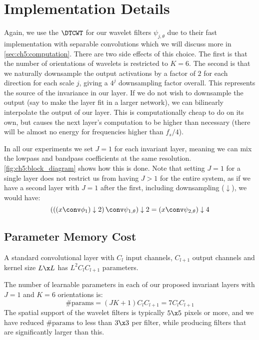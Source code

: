 \section{Implementation Details}\label{sec:ch5:implementation}
Again, we use the $\DTCWT$ \cite{selesnick_dual-tree_2005} for our wavelet filters
$\psi_{j, \theta}$ due to their fast implementation with separable convolutions
which we will discuss more in \autoref{sec:ch5:computation}.  There are two side
effects of this choice. The first is that the number of orientations of wavelets
is restricted to $K=6$. The second is that we naturally downsample the output
activations by a factor of $2$ for each direction for each scale $j$, giving a 
$4^j$ downsampling factor overall. This represents the
source of the invariance in our layer. If we do not wish to downsample the
output (say to make the layer fit in a larger network), we can bilinearly
interpolate the output of our layer. This is computationally cheap to do on its
own, but causes the next layer's computation to be higher than necessary (there
will be almost no energy for frequencies higher than $f_s/4$).

In all our experiments we set $J=1$ for each invariant layer,
meaning we can mix the lowpass and bandpass coefficients at the same resolution.
\autoref{fig:ch5:block_diagram} shows how this is done. Note that setting $J=1$ for
a single layer does not restrict us from having $J>1$ for the entire system, as
if we have a second layer with $J=1$ after the first, including downsampling
($\downarrow$), we would have:
%
\begin{equation}
  \left(\left(\left(x \conv \phi_1\right) \downarrow 2\right) \conv \psi_{1, \theta}\right) 
    \downarrow 2 = \left(x \conv \psi_{2, \theta}\right) \downarrow 4
\end{equation}

\subsection{Parameter Memory Cost}\label{sec:ch5:memory}
A standard convolutional layer with $C_l$ input channels, $C_{l+1}$ output channels
and kernel size $L\x L$ has $L^2C_{l}C_{l+1}$ parameters. 

The number of learnable parameters in each of our proposed invariant layers with
$J=1$ and $K=6$ orientations is:
%
\begin{equation}
  \text{\#params} = (JK+1)C_{l}C_{l+1} = 7C_{l}C_{l+1}
\end{equation} 
%
The spatial support of the wavelet filters is typically $5\x 5$ pixels or more,
and we have reduced $\text{\#params}$ to less than $3\x3$ per filter, while
producing filters that are significantly larger than this.

